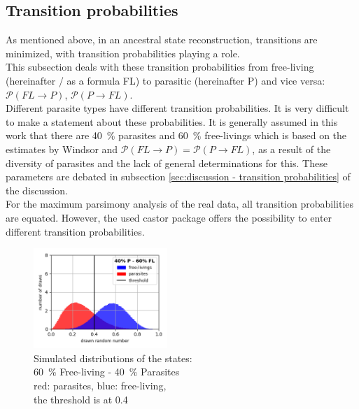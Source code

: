     \subsection{Transition probabilities}
      As mentioned above, in an ancestral state reconstruction, transitions are minimized, with 
        transition probabilities playing a role. \\
      This subsection deals with these transition probabilities from free-living (hereinafter / as a 
        formula FL) to parasitic (hereinafter P) and vice versa: $\mathcal{P}(FL \rightarrow P)$, 
        $\mathcal{P}(P \rightarrow FL)$. \\
      Different parasite types have different transition probabilities. It is very difficult to make a 
        statement about these probabilities. It is generally assumed in this work that there are 40~\% 
        parasites and 60~\% free-livings which is based on the estimates by Windsor \cite{Windsor1998} 
        and $\mathcal{P}(FL \rightarrow P) = \mathcal{P}(P \rightarrow FL)$, as a result of the 
        diversity of parasites and the lack of general determinations for this. These parameters are 
        debated in subsection \ref{sec:discussion - transition probabilities} of the discussion. \\

      For the maximum parsimony analysis of the real data, all transition probabilities are equated.
        However, the used castor package \cite{Louca2017} offers the possibility to enter different 
        transition probabilities.
      \begin{figure}
        \begin{center}
          \includegraphics[trim = 0mm 0mm 0mm 0mm, clip, width=0.45\textwidth]{Figures/40-60.png}
        \end{center}
        \caption{Simulated distributions of the states: \\
          60~\% Free-living - 40~\% Parasites \\
          red: parasites, blue: free-living, \\
          the threshold is at 0.4}
        \label{fig:Beta distribution}
      \end{figure}

